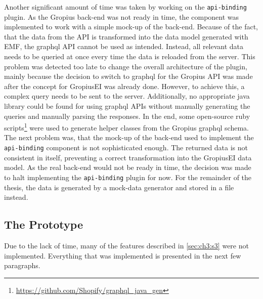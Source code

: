 Another significant amount of time was taken by working on the \lstinline|api-binding| plugin.
As the \gls{Gropius} back-end was not ready in time, the component was implemented to work with a simple mock-up of the back-end.
Because of the fact, that the data from the \gls{API} is transformed into the data model generated with \gls{EMF}, 
the \gls{graphql} \gls{API} cannot be used as intended.
Instead, all relevant data needs to be queried at once every time the data is reloaded from the server.
This problem was detected too late to change the overall architecture of the plugin, 
mainly because the decision to switch to \gls{graphql} for the \gls{Gropius} \gls{API} was made after the concept for \gls{GropiusEI} was already done.
However, to achieve this, a complex query needs to be sent to the server.
Additionally, no appropriate \gls{java} library could be found for using \gls{graphql} \glspl{API} without manually generating the queries and manually parsing the responses. 
In the end, some open-source ruby scripts\footnote{\url{https://github.com/Shopify/graphql_java_gen}} were used to generate helper classes from the \gls{Gropius} \gls{graphql} schema.
The next problem was, that the mock-up of the back-end used to implement the \lstinline|api-binding| component is not sophisticated enough.
The returned data is not consistent in itself, preventing a correct transformation into the \gls{GropiusEI} data model.
As the real back-end would not be ready in time, the decision was made to halt implementing the \lstinline|api-binding| plugin for now.
For the remainder of the thesis, the data is generated by a mock-data generator and stored in a file instead.

\subsection{The Prototype}
Due to the lack of time, many of the features described in \cref{sec:ch3:s3} were not implemented.
Everything that was implemented is presented in the next few paragraphs.

